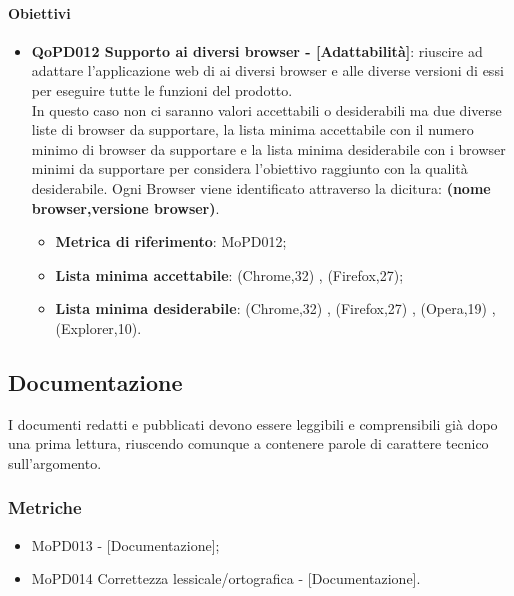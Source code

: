 \documentclass[../piano-di-qualifica.tex]{subfiles}
\begin{document}
\paragraph{Obiettivi}
\label{sub:obiettivi}
\begin{itemize}
    \item \textbf{QoPD012 Supporto ai diversi browser - [Adattabilità]}: riuscire ad adattare l'applicazione web di  ai diversi browser e alle diverse versioni di essi per eseguire tutte le funzioni del prodotto.
        \\ In questo caso non ci saranno valori accettabili o desiderabili ma due diverse liste di browser da supportare, la lista minima accettabile con il numero minimo di browser da supportare e la lista minima desiderabile con i browser minimi da supportare per considera l'obiettivo raggiunto con la qualità desiderabile.
        Ogni Browser viene identificato attraverso la dicitura: \textbf{(nome browser,versione browser)}.
        \begin{itemize}
            \item \textbf{Metrica di riferimento}: MoPD012;
            \item \textbf{Lista minima accettabile}: {(Chrome,32) , (Firefox,27)};
            \item \textbf{Lista minima desiderabile}: {(Chrome,32) , (Firefox,27) , (Opera,19) , (Explorer,10)}.
        \end{itemize}
\end{itemize}

\subsection{Documentazione}%
\label{sub:documentazione}
I documenti redatti e pubblicati devono essere leggibili e comprensibili già dopo una prima lettura, riuscendo comunque a contenere parole di carattere tecnico sull'argomento.

\subsubsection{Metriche}
\label{sub:metriche}
\begin{itemize}
    \item MoPD013  - [Documentazione];
    \item MoPD014 Correttezza lessicale/ortografica - [Documentazione].
\end{itemize}
\end{document}
